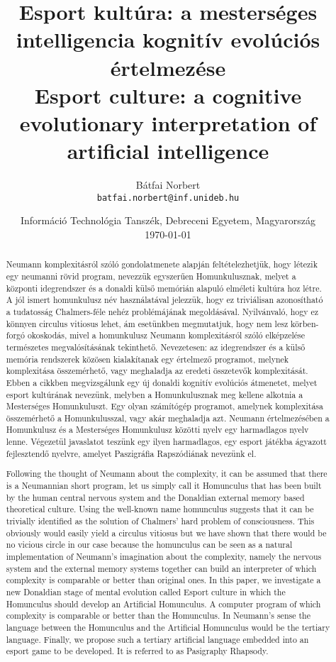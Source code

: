 \documentclass[a4paper]{article}
\title{Esport kultúra: a mesterséges intelligencia kognitív evolúciós értelmezése\\Esport culture: a cognitive evolutionary interpretation of artificial intelligence}
\author{
	Bátfai Norbert\\
	\texttt{batfai.norbert@inf.unideb.hu}}
\date{
    Információ Technológia Tanszék, Debreceni Egyetem, Magyarország\\
    \today
}
\begin{document}
\maketitle

{
\begin{abstract}
Neumann komplexitásról szóló gondolatmenete alapján fel\-té\-te\-lez\-het\-jük, hogy létezik egy neumanni rövid program, nevezzük egyszerűen Homunkulusznak, melyet a központi idegrendszer és a donaldi külső me\-mó\-ri\-án alapuló elméleti kultúra hoz létre. A jól ismert homunkulusz név hasz\-ná\-la\-tá\-val jelezzük, hogy ez triviálisan azonosítható a tudatosság Chalmers-féle nehéz problémájának megoldásával. Nyilvánvaló, hogy ez könnyen circulus vitiosus lehet, ám esetünkben megmutatjuk, hogy nem lesz körben-forgó okoskodás, mivel a homunkulusz Neumann komplexitásról szóló elképzelése természetes megvalósításának tekinthető. Nevezetesen: az idegrendszer és a külső memória rendszerek közösen kialakítanak egy értelmező programot, melynek komplexitása összemérhető, vagy meghaladja az eredeti összetevők komplexitását. Ebben a cikkben megvizsgálunk egy új donaldi kognitív evolúciós átmenetet, melyet esport kultúrának nevezünk, melyben a Homunkulusznak meg kellene alkotnia a Mesterséges Homunkuluszt. Egy olyan számítógép programot, amelynek komplexitása összemérhető a Homunkulusszal, vagy akár meghaladja azt. Neumann értelmezésében a Homunkulusz és a Mesterséges Homunkulusz közötti nyelv egy harmadlagos nyelv lenne. Végezetül javaslatot teszünk egy ilyen harmadlagos, egy esport játékba ágyazott fejlesztendő nyelvre, amelyet Paszigráfia Rapszódiának nevezünk el.
\end{abstract}
}

{
\begin{abstract}
Following the thought of Neumann about the complexity, it can be assumed that there is a Neumannian short program, let us simply call it Homunculus that has been built by the human central nervous system and the Donaldian external memory based theoretical culture. Using the well-known name homunculus suggests that it can be trivially identified as the solution of Chalmers' hard problem of consciousness. This obviously would easily yield a circulus vitiosus but we have shown that there would be no vicious circle in our case because the homunculus can be seen as a natural implementation of Neumann's imagination about the complexity, namely the nervous system and the external memory systems together can build an interpreter of which complexity is comparable or better than original ones. In this paper, we investigate a new Donaldian stage of mental evolution called Esport culture in which the Homunculus should develop an Artificial Homunculus. A computer program of which complexity is comparable or better than the Homunculus. In Neumann's sense the language between the Homunculus and the Artificial Homunculus would be the tertiary language. Finally, we propose such a tertiary artificial language embedded into an esport game to be developed. It is referred to as Pasigraphy Rhapsody.
\end{abstract}
}
\end{document}
